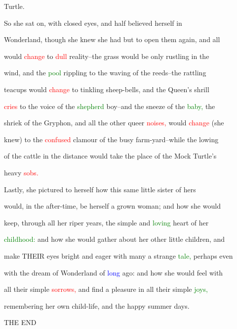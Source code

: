  Turtle.



 So she sat on, with closed eyes, and half believed herself in

 Wonderland, though she knew she had but to open them again, and all

 would \textcolor{red}{change} to \textcolor{red}{dull} reality--the grass would be only rustling in the

 wind, and the \textcolor{green}{pool} rippling to the waving of the reeds--the rattling

 teacups would \textcolor{red}{change} to tinkling sheep-bells, and the Queen’s \textcolor{BurntOrange}{shrill}

 \textcolor{red}{cries} to the voice of the \textcolor{green}{shepherd} boy--and the \textcolor{BurntOrange}{sneeze} of the \textcolor{green}{baby,} the

 \textcolor{BurntOrange}{shriek} of the Gryphon, and all the other queer \textcolor{red}{noises,} would \textcolor{red}{change} (she

 knew) to the \textcolor{red}{confused} clamour of the busy farm-yard--while the lowing

 of the cattle in the distance would take the place of the Mock Turtle’s

 heavy \textcolor{red}{sobs.}



 Lastly, she pictured to herself how this same little sister of hers

 would, in the after-time, be herself a grown woman; and how she would

 keep, through all her riper years, the simple and \textcolor{green}{loving} heart of her

 \textcolor{green}{childhood:} and how she would gather about her other little \textcolor{BurntOrange}{children,} and

 make THEIR eyes bright and \textcolor{BurntOrange}{eager} with many a strange \textcolor{green}{tale,} perhaps even

 with the dream of Wonderland of \textcolor{blue}{long} ago: and how she would feel with

 all their simple \textcolor{red}{sorrows,} and find a pleasure in all their simple \textcolor{green}{joys,}

 remembering her own child-life, and the \textcolor{BurntOrange}{happy} summer days.



 THE END











